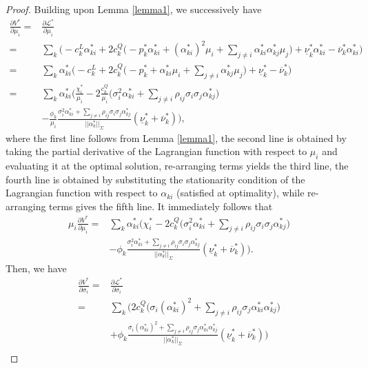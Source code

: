 \documentclass{article}
\begin{document}
\begin{proof}
Building upon Lemma \ref{lemma1}, we successively have
\begin{align*}
\frac{\partial V^*}{\partial \mu_i} =& \frac{\partial \mathcal{L}^*}{\partial \mu_i}\\
=& \sum_k \Big(-c_k^L \alpha_{ki}^* + 2 c_k^Q \big(- p_k^* \alpha_{ki}^* + (\alpha_{ki}^*)^2 \mu_i + \sum_{j \ne i} \alpha_{ki}^* \alpha_{kj}^* \mu_j\big) + \underline{\nu}_k^* \alpha_{ki}^* - \overline{\nu}_k^* \alpha_{ki}^*\Big)\\
=& \sum_k \alpha_{ki}^* \Big(-c_k^L + 2 c_k^Q \big(- p_k^* + \alpha_{ki}^* \mu_i + \sum_{j \ne i} \alpha_{kj}^* \mu_j\big) + \underline{\nu}_k^* - \overline{\nu}_k^*\Big)\\
=& \sum_k \alpha_{ki}^* \Big(\frac{\chi_i^*}{\mu_i} - 2 \frac{c_k^Q}{\mu_i}\big(\sigma_i^2 \alpha_{ki}^* + \sum_{j \ne i} \rho_{ij} \sigma_i \sigma_j \alpha_{kj}^*\big)\\
 &- \frac{\phi_k}{\mu_i} \frac{\sigma_i^2 \alpha_{ki}^* + \sum_{j \ne i} \rho_{ij} \sigma_i \sigma_j  \alpha_{kj}^*}{||\alpha_k^*||_{\Sigma}}(\underline{\nu}_k^* + \overline{\nu}_k^*)\Big),
\end{align*}
where the first line follows from Lemma \ref{lemma1}, the second line is obtained by taking the partial derivative of the Lagrangian function with respect to $\mu_i$ and evaluating it at the optimal solution, re-arranging terms yields the third line, the fourth line is obtained by substituting the stationarity condition of the Lagrangian function with respect to $\alpha_{ki}$ (satisfied at optimality), while re-arranging terms gives the fifth line. It immediately follows that
\begin{align*}
\mu_i \frac{\partial V^*}{\partial \mu_i} =& \sum_k\alpha_{ki}^*\Big(\chi_i^* - 2 c_k^Q \big(\sigma_i^2 \alpha_{ki}^* + \sum_{j \ne i} \rho_{ij} \sigma_i \sigma_j \alpha_{kj}^*\big)\\
 &- \phi_k \frac{\sigma_i^2 \alpha_{ki}^* + \sum_{j \ne i} \rho_{ij} \sigma_i \sigma_j  \alpha_{kj}^*}{||\alpha_k^*||_{\Sigma}}(\underline{\nu}_k^* + \overline{\nu}_k^*)\Big).
\end{align*}
Then, we have
\begin{align*}
\frac{\partial V^*}{\partial \sigma_i} =& \frac{\partial \mathcal{L}^*}{\partial \sigma_i}\\
=& \sum_k \Big(2c_k^Q\big(\sigma_i (\alpha_{ki}^*)^2 + \sum_{j \ne i} \rho_{ij} \sigma_j \alpha_{ki}^*\alpha_{kj}^*\big)\\
&+ \phi_k \frac{\sigma_i (\alpha_{ki}^*)^2 + \sum_{j \ne i} \rho_{ij} \sigma_j \alpha_{ki}^*\alpha_{kj}^*}{||\alpha_k^*||_{\Sigma}}(\underline{\nu}_k^* + \overline{\nu}_k^*)\Big)\\

\end{align*}
\end{proof}
\end{document}

